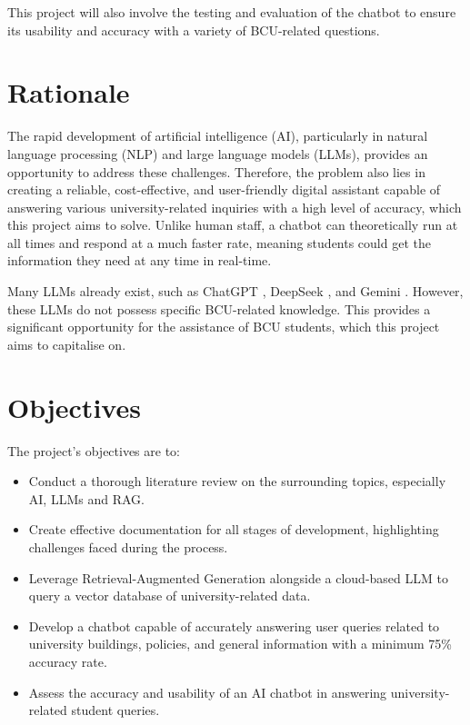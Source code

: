 \para This project will also involve the testing and evaluation of the chatbot to ensure its usability and accuracy with a variety of BCU-related 
questions.

\section{Rationale}
The rapid development of artificial intelligence (AI), particularly in natural language processing (NLP) and large language models (LLMs), provides 
an opportunity to address these challenges. Therefore, the problem also lies in creating a reliable, cost-effective, and user-friendly digital 
assistant capable of answering various university-related inquiries with a high level of accuracy, which this project 
aims to solve. Unlike human staff, a chatbot can theoretically run at all times and respond at a much faster rate, 
meaning students could get the information they need at any time in real-time.

\para Many LLMs already exist, such as ChatGPT \autocite{openaiChatGPT}, DeepSeek \autocite{deepseekDeepSeek}, and 
Gemini \autocite{googleGeminiChatSupercharge}. However, these LLMs do not possess specific BCU-related knowledge. 
This provides a significant opportunity for the assistance of BCU students, which this project aims to capitalise on.

\section{Objectives}\label{sec:AimsAndObjectives}
The project's objectives are to:

\begin{itemize}
    \item Conduct a thorough literature review on the surrounding topics, especially AI, LLMs and RAG.
    \item Create effective documentation for all stages of development, highlighting challenges faced during the process.
    \item Leverage Retrieval-Augmented Generation alongside a cloud-based LLM to query a vector database of university-related data.
    \item Develop a chatbot capable of accurately answering user queries related to university 
    buildings, policies, and general information with a minimum 75\% accuracy rate.
    \item Assess the accuracy and usability of an AI chatbot in answering university-related student queries.
\end{itemize}

